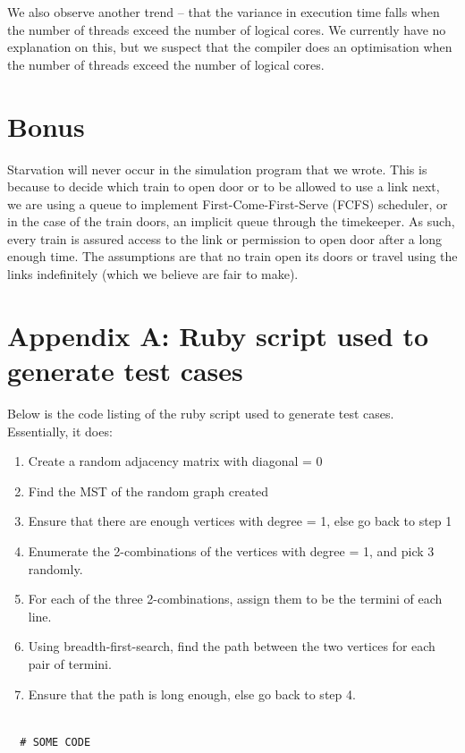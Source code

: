 \documentclass[a4paper,12pt]{article}
\begin{document}
We also observe another trend -- that the variance in execution time falls when the number of threads exceed the number of logical cores. We currently have no explanation on this, but we suspect that the compiler does an optimisation when the number of threads exceed the number of logical cores.


\section{Bonus}
Starvation will never occur in the simulation program that we wrote. This is because to decide which train to open door or to be allowed to use a link next, we are using a queue to implement First-Come-First-Serve (FCFS) scheduler, or in the case of the train doors, an implicit queue through the timekeeper. As such, every train is assured access to the link or permission to open door after a long enough time. The assumptions are that no train open its doors or travel using the links indefinitely (which we believe are fair to make).

\newpage
\section{Appendix A: Ruby script used to generate test cases}
Below is the code listing of the ruby script used to generate test cases. Essentially, it does:
\begin{enumerate}
	\item Create a random adjacency matrix with diagonal = 0
	\item Find the MST of the random graph created
	\item Ensure that there are enough vertices with degree = 1, else go back to step 1
	\item Enumerate the 2-combinations of the vertices with degree = 1, and pick 3 randomly.
	\item For each of the three 2-combinations, assign them to be the termini of each line.
	\item Using breadth-first-search, find the path between the two vertices for each pair of termini.
	\item Ensure that the path is long enough, else go back to step 4.
\end{enumerate}
\begin{verbatim}

  # SOME CODE

	\end{verbatim}
\end{document}

